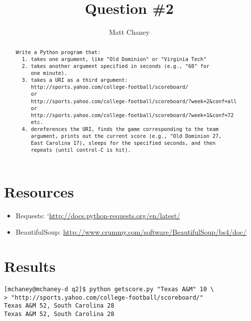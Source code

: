 \documentclass[10pt,letterpaper]{article}
\begin{document}
\title{Question \#2}
\author{Matt Chaney}

\maketitle

\begin{abstract}
\begin{verbatim}
Write a Python program that:
  1. takes one argument, like "Old Dominion" or "Virginia Tech"
  2. takes another argument specified in seconds (e.g., "60" for 
     one minute).
  3. takes a URI as a third argument: 
     http://sports.yahoo.com/college-football/scoreboard/
     or
     http://sports.yahoo.com/college-football/scoreboard/?week=2&conf=all
     or
     http://sports.yahoo.com/college-football/scoreboard/?week=1&conf=72
     etc.
  4. dereferences the URI, finds the game corresponding to the team
     argument, prints out the current score (e.g., "Old Dominion 27, 
     East Carolina 17), sleeps for the specified seconds, and then
     repeats (until control-C is hit).
\end{verbatim}
\end{abstract}

\section{Resources}
\begin{itemize}
\item Requests: `\url{http://docs.python-requests.org/en/latest/}
\item BeautifulSoup: \url{http://www.crummy.com/software/BeautifulSoup/bs4/doc/}
\end{itemize}

\section{Results}
\begin{verbatim}
[mchaney@mchaney-d q2]$ python getscore.py "Texas A&M" 10 \
> "http://sports.yahoo.com/college-football/scoreboard/"
Texas A&M 52, South Carolina 28
Texas A&M 52, South Carolina 28
\end{verbatim}
\end{document}
